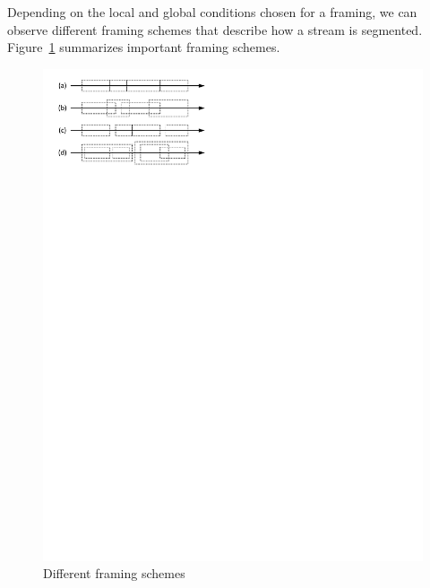 \documentclass{vldb}
\begin{document}
Depending on the local and global conditions chosen for a framing, we can observe different framing schemes that describe how a stream is segmented. Figure~\ref{fig:framing-schemes} summarizes important framing schemes.

\begin{figure}[htb]
   \centering
   \includegraphics[width=.9\columnwidth]{figures/framing-schemes}
   \caption{Different framing schemes}
   \label{fig:framing-schemes}
\end{figure}
\end{document}
